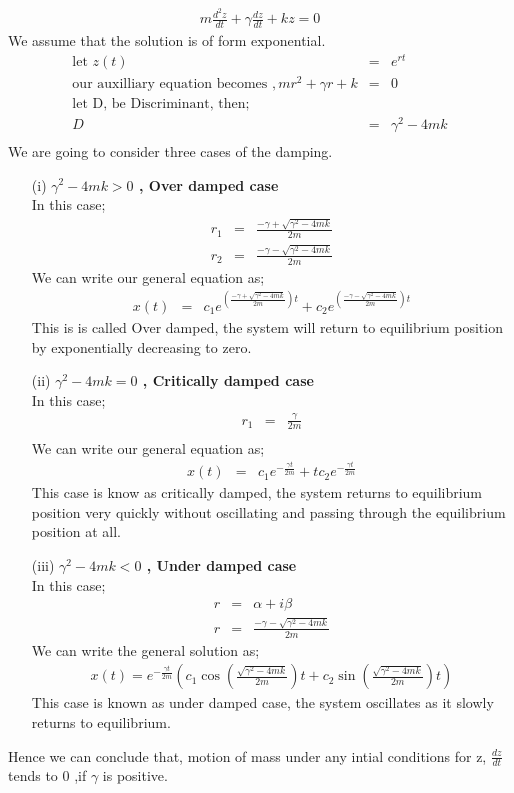\documentclass[12pt,a4paper]{article}
\begin{document}
\begin{eqnarray*}
m\frac{d^2z}{dt}+\gamma \frac{dz}{dt}+kz=0
\end{eqnarray*}
We assume that the solution is of form exponential.
\begin{eqnarray*}
\text{let}\, \, z(t) &=& e^{rt}\\
\text{our auxilliary equation becomes}\,\,, mr^2+\gamma r+k&=&0\\
\text{let D, be Discriminant, then;}\\
D&=& \gamma ^2-4mk\\
\end{eqnarray*}
We are going to consider three cases of the damping.
\begin{enumerate}
\item[(i)]
\textbf{$\gamma ^2-4mk > 0$  , Over damped case}\\
In this case;
\begin{eqnarray*}
r_1&=& \frac{-\gamma +\sqrt{\gamma^2-4mk}}{2m}\\
r_2&=& \frac{-\gamma -\sqrt{\gamma^2-4mk}}{2m}
\end{eqnarray*}
We can write our general equation as;
\begin{eqnarray*}
x(t)&=&c_1e^{\left(\frac{-\gamma +\sqrt{\gamma^2-4mk}}{2m}\right) t}+c_2e^{\left(\frac{-\gamma -\sqrt{\gamma^2-4mk}}{2m}\right) t}
\end{eqnarray*}
This is is called Over damped, the system will return to equilibrium position by exponentially decreasing to zero.

\item[(ii)]
\textbf{$\gamma ^2-4mk = 0$ , Critically damped case }\\
In this case;
\begin{eqnarray*}
r_1&=&\frac{\gamma}{2m}\\
\end{eqnarray*}
We can write our general equation as;
\begin{eqnarray*}
x(t)&=&c_1e^{-\frac{\gamma t}{2m}}+tc_2e^{-\frac{\gamma t}{2m}}
\end{eqnarray*}
This case is know as critically damped, the system returns to equilibrium position very quickly without oscillating and passing through the equilibrium position at all. 

\item[(iii)]
\textbf{$\gamma ^2-4mk < 0$  , Under damped case }\\
In this case;
\begin{eqnarray*}
r&=& \alpha +i\beta\\
r&=& \frac{-\gamma -\sqrt{\gamma ^2 -4mk}}{2m}
\end{eqnarray*}
We can write the general solution as;
\begin{eqnarray*}
x(t)=e^{-\frac{\gamma t}{2m}} \left(   c_1 \cos\left( \frac{\sqrt{\gamma ^2 -4mk}}{2m}  \right)t   + c_2 \sin\left( \frac{\sqrt{\gamma ^2 -4mk}}{2m}  \right)t  \right)
\end{eqnarray*}
This case is known as under damped case, the system oscillates as it slowly returns to equilibrium.
\end{enumerate}
Hence we can conclude that, motion of mass under any intial conditions for z, $\frac{dz}{dt}$ tends to 0 ,if $\gamma$ is positive.
\end{document}

